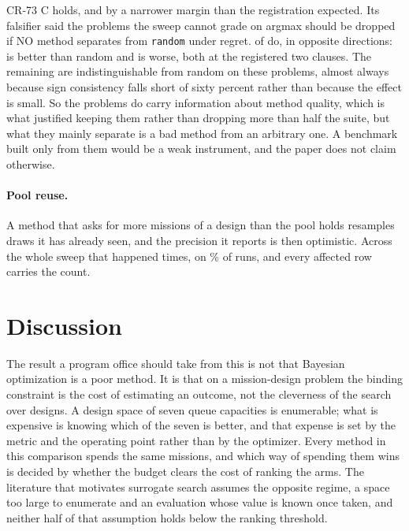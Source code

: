 \documentclass[11pt]{article}
\begin{document}
CR-73 C holds, and by a narrower margin than the registration expected. Its falsifier said the
\RsSepUnresN{} problems the sweep cannot grade on argmax should be dropped if NO method separates
from \texttt{random} under regret. \RsSepUnresEither{} of \RsSepUnresOf{} do, in opposite
directions: \RsSepUnresRegNames{} is better than random and \RsSepUnresWorseNames{} is worse, both
at the registered two clauses. The remaining \RsSepUnresTied{} are indistinguishable from random on
these problems, almost always because sign consistency falls short of sixty percent rather than because
the effect is small. So the problems do carry information about method quality, which is what
justified keeping them rather than dropping more than half the suite, but what they mainly separate
is a bad method from an arbitrary one. A benchmark built only from them would be a weak instrument,
and the paper does not claim otherwise.

\paragraph{Pool reuse.} A method that asks for more missions of a design than the pool holds
resamples draws it has already seen, and the precision it reports is then optimistic. Across the
whole sweep that happened \RsReuse{} times, on \RsReuseRows{}\% of runs, and every affected row
carries the count.

\section{Discussion}
\label{sec:discussion}

The result a program office should take from this is not that Bayesian optimization is a poor
method. It is that on a mission-design problem the binding constraint is the cost of estimating an
outcome, not the cleverness of the search over designs. A design space of seven queue capacities is
enumerable; what is expensive is knowing which of the seven is better, and that expense is set by
the metric and the operating point rather than by the optimizer. Every method in this comparison spends the same
missions, and which way of spending them wins is decided by whether the budget clears the cost of
ranking the arms. The literature that motivates surrogate search assumes the opposite regime, a
space too large to enumerate and an evaluation whose value is known once taken, and neither half of
that assumption holds below the ranking threshold.
\end{document}
